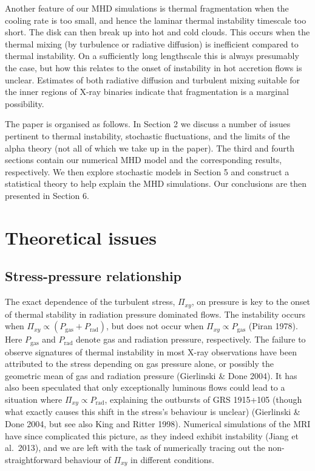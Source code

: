 \documentclass[useAMS]{mn2e}
\begin{document}
Another feature of our MHD simulations is thermal fragmentation 
when the cooling rate is too small,
and hence the laminar thermal instability timescale too short. The
disk can then break up into hot and cold clouds. This occurs when the
thermal mixing (by turbulence or radiative diffusion) is inefficient
compared to thermal instability. On a sufficiently long lengthscale
this is always presumably the case, but how this relates to the onset
of instability in hot
accretion flows is unclear. Estimates of both radiative diffusion and turbulent mixing suitable 
for the inner regions of X-ray binaries indicate that fragmentation is
a marginal possibility.

The paper is organised as follows. In Section 2 we discuss a number of
issues pertinent to thermal instability, stochastic
fluctuations, and the limits of the alpha theory (not all of which we
take up in the paper). The third and fourth sections contain our numerical MHD
model and the corresponding results, respectively. We then explore
stochastic models in Section 5 and construct a statistical theory to
help explain the MHD
simulations. Our conclusions are then presented in Section 6.  


\section{Theoretical issues}

\subsection{Stress-pressure relationship}

The exact dependence of the turbulent stress, $\Pi_{xy}$, on pressure 
is key to the onset of thermal stability in radiation pressure dominated flows. 
The instability occurs when $\Pi_{xy}\propto
(P_{\text{gas}}+P_{\text{rad}})$, but does not occur
when $\Pi_{xy}\propto P_{\text{gas}}$ (Piran
1978). Here $P_{\text{gas}}$ and $P_{\text{rad}}$ denote gas and
radiation pressure, respectively. The failure to observe
signatures of thermal instability in most X-ray observations have been
attributed to the stress depending on gas pressure alone, or possibly
the geometric mean of gas and radiation pressure (Gierlinski \& Done
2004).
It has
also been speculated that only exceptionally luminous flows could lead to a
situation where $\Pi_{xy}\propto P_{\text{rad}}$, explaining the
outbursts of GRS 1915+105 (though what exactly causes this shift in the
stress's behaviour is unclear) (Gierlinski \& Done 2004, but see also 
King and
Ritter 1998). 
Numerical simulations of the MRI have since
complicated this picture, as they indeed exhibit instability 
(Jiang et al.~2013),
and we are left with the task of numerically tracing out 
the non-straightforward behaviour of $\Pi_{xy}$ in different conditions.
\end{document}
